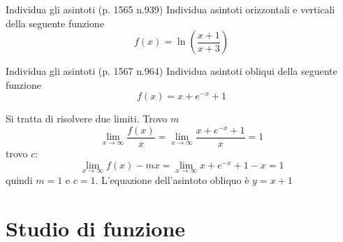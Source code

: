 \begin{esercizio}{Individua gli asintoti (p. 1565 n.939)}
	Individua asintoti orizzontali e verticali della seguente funzione
	\[
		f\left(x\right) = \ln\left(\frac{x+1}{x + 3}\right)
	\]
\end{esercizio}

\begin{esercizio}{Individua gli asintoti (p. 1567 n.964)}
	Individua asintoti obliqui della seguente funzione
	\[
		f\left(x\right) = x + e^{-x} +1
	\]
\end{esercizio}
Si tratta di risolvere due limiti. Trovo $ m $
\[
	\lim_{x \to \infty} \frac{f(x)}{x} = \lim_{x \to \infty} \frac{x + e^{-x} + 1}{x} = 1
\]
trovo $ c $:
\[
	\lim_{x \to \infty} f(x) - mx = \lim_{x \to \infty} x + e^{-x} + 1 - x = 1
\]
quindi $ m = 1 $ e $ c = 1 $. L'equazione dell'asintoto obliquo è $ y = x + 1 $

\section{Studio di funzione}
